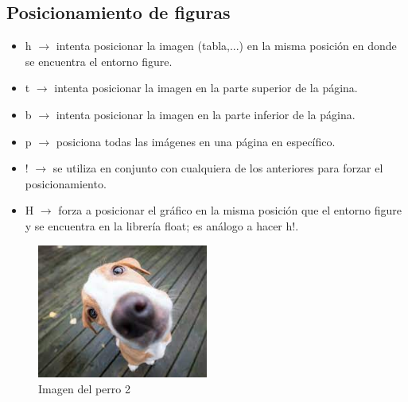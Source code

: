 \documentclass[]{article}
\begin{document}
\subsection{Posicionamiento de figuras}

\begin{itemize}
	\item h $\rightarrow$ intenta posicionar la imagen (tabla,...) en la misma posición en donde se encuentra el entorno figure.
	\item t $\rightarrow$ intenta posicionar la imagen en la parte superior de la página.
	\item b $\rightarrow$ intenta posicionar la imagen en la parte inferior de la página. 
	\item p $\rightarrow$ posiciona todas las imágenes en una página en específico. 
	\item ! $\rightarrow$ se utiliza en conjunto con cualquiera de los anteriores para forzar el posicionamiento.
	\item H $\rightarrow$ forza a posicionar el gráfico en la misma posición que el entorno figure y se encuentra en la librería float; es análogo a hacer h!.
\end{itemize}

\begin{figure}[h!]
	\centering
	\includegraphics[width = 0.5\textwidth ]{perro2.jpg}
	\caption{Imagen del perro 2}
	\label{fig:perro2Pos}
\end{figure}
\end{document}

